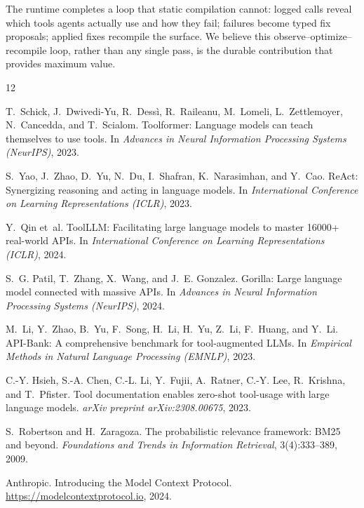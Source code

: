 \documentclass[11pt]{article}
\begin{document}
The runtime completes a loop that static compilation cannot: logged calls
reveal which tools agents actually use and how they fail; failures become
typed fix proposals; applied fixes recompile the surface. We believe this
observe--optimize--recompile loop, rather than any single pass, is the durable
contribution that provides maximum value.

\begin{thebibliography}{12}

T.~Schick, J.~Dwivedi-Yu, R.~Dess\`i, R.~Raileanu, M.~Lomeli, L.~Zettlemoyer,
N.~Cancedda, and T.~Scialom.
\newblock Toolformer: Language models can teach themselves to use tools.
\newblock In \emph{Advances in Neural Information Processing Systems (NeurIPS)}, 2023.

S.~Yao, J.~Zhao, D.~Yu, N.~Du, I.~Shafran, K.~Narasimhan, and Y.~Cao.
\newblock ReAct: Synergizing reasoning and acting in language models.
\newblock In \emph{International Conference on Learning Representations (ICLR)}, 2023.

Y.~Qin et~al.
\newblock ToolLLM: Facilitating large language models to master 16000+ real-world APIs.
\newblock In \emph{International Conference on Learning Representations (ICLR)}, 2024.

S.~G. Patil, T.~Zhang, X.~Wang, and J.~E. Gonzalez.
\newblock Gorilla: Large language model connected with massive APIs.
\newblock In \emph{Advances in Neural Information Processing Systems (NeurIPS)}, 2024.

M.~Li, Y.~Zhao, B.~Yu, F.~Song, H.~Li, H.~Yu, Z.~Li, F.~Huang, and Y.~Li.
\newblock API-Bank: A comprehensive benchmark for tool-augmented LLMs.
\newblock In \emph{Empirical Methods in Natural Language Processing (EMNLP)}, 2023.

C.-Y. Hsieh, S.-A. Chen, C.-L. Li, Y.~Fujii, A.~Ratner, C.-Y. Lee, R.~Krishna,
and T.~Pfister.
\newblock Tool documentation enables zero-shot tool-usage with large language models.
\newblock \emph{arXiv preprint arXiv:2308.00675}, 2023.

S.~Robertson and H.~Zaragoza.
\newblock The probabilistic relevance framework: BM25 and beyond.
\newblock \emph{Foundations and Trends in Information Retrieval}, 3(4):333--389, 2009.

Anthropic.
\newblock Introducing the Model Context Protocol.
\newblock \url{https://modelcontextprotocol.io}, 2024.


\end{thebibliography}
\end{document}
